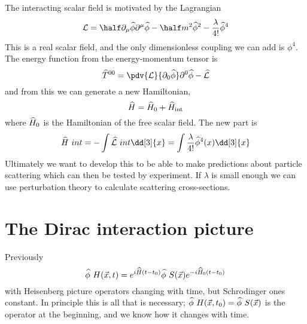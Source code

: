 The interacting scalar field is motivated by the Lagrangian
\begin{equation}
  \label{eq:53}
  \Lag = \half \pd{\mu} \Op{\phi} \pu{\mu} \Op{\phi} 
  -\half m^2 \Op{\phi}^2 - \frac{\lambda}{4!} \Op{\phi}^4
\end{equation}
This is a real scalar field, and the only dimensionless coupling we
can add is $\phi^4$. The energy function from the energy-momentum
tensor is
\[ \Op{T}^{00} = \pdv{\Lag}{\pd{0} \Op{\phi}} \pu{0} \Op{\phi} -
\Op{\Lag} \] and from this we can generate a new Hamiltonian,
\begin{equation}
  \label{eq:53}
  {\widehat{H}} = {\widehat{H}}_0 + {\widehat{H}}_{\rm int}
\end{equation}
where ${\widehat{H}}_0$ is the Hamiltonian of the free scalar field. The new
part is
\begin{equation}
  \label{eq:54}
  \Op{H}~{int} = - \int \Op{\Lag}~{int} \dd[3]{x} = \int \frac{\lambda}{4!} \Op{\phi}^4(x) \dd[3]{x}
\end{equation}
Ultimately we want to develop this to be able to make predictions
about particle scattering which can then be tested by experiment. If
$\lambda$ is small enough we can use perturbation theory to calculate
scattering cross-sections.

\section{The Dirac interaction picture}
\label{sec:interaction-picture}

Previously 
\begin{equation}
  \label{eq:55}
  {\widehat{\phi}}~H (\vec{x}, t) = e^{i {\widehat{H}}(t-t_0)} {\widehat{\phi}}~S (\vec{x}) e^{-i {\widehat{H}}_0 (t-t_0)}
\end{equation}
with Heisenberg picture operators changing with time, but Schrodinger
ones constant. In principle this is all that is necessary;
${\widehat{\phi}}~H (\vec{x}, t_0) = {\widehat{\phi}}~S(\vec{x})$ is the operator at
the beginning, and we know how it changes with time.

